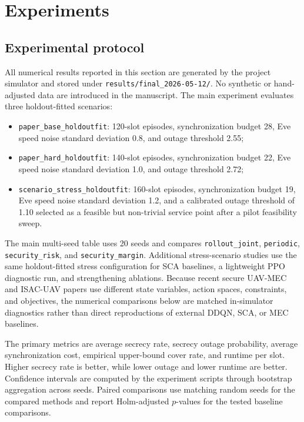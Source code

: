 \section{Experiments}
\label{sec:experiments}

\subsection{Experimental protocol}

All numerical results reported in this section are generated by the project simulator and stored under \texttt{results/final\_2026-05-12/}. No synthetic or hand-adjusted data are introduced in the manuscript. The main experiment evaluates three holdout-fitted scenarios:
\begin{itemize}
    \item \texttt{paper\_base\_holdoutfit}: 120-slot episodes, synchronization budget 28, Eve speed noise standard deviation 0.8, and outage threshold 2.55;
    \item \texttt{paper\_hard\_holdoutfit}: 140-slot episodes, synchronization budget 22, Eve speed noise standard deviation 1.0, and outage threshold 2.72;
    \item \texttt{scenario\_stress\_holdoutfit}: 160-slot episodes, synchronization budget 19, Eve speed noise standard deviation 1.2, and a calibrated outage threshold of 1.10 selected as a feasible but non-trivial service point after a pilot feasibility sweep.
\end{itemize}
The main multi-seed table uses 20 seeds and compares \texttt{rollout\_joint}, \texttt{periodic}, \texttt{security\_risk}, and \texttt{security\_margin}. Additional stress-scenario studies use the same holdout-fitted stress configuration for SCA baselines, a lightweight PPO diagnostic run, and strengthening ablations. Because recent secure UAV-MEC and ISAC-UAV papers use different state variables, action spaces, constraints, and objectives, the numerical comparisons below are matched in-simulator diagnostics rather than direct reproductions of external DDQN, SCA, or MEC baselines.

The primary metrics are average secrecy rate, secrecy outage probability, average synchronization cost, empirical upper-bound cover rate, and runtime per slot. Higher secrecy rate is better, while lower outage and lower runtime are better. Confidence intervals are computed by the experiment scripts through bootstrap aggregation across seeds. Paired comparisons use matching random seeds for the compared methods and report Holm-adjusted $p$-values for the tested baseline comparisons.


